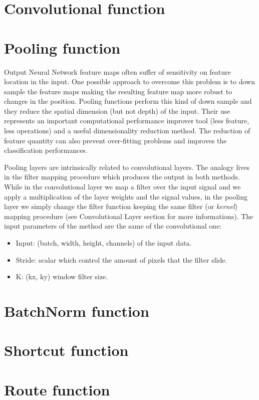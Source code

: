 \documentclass{standalone}
\begin{document}


\section[Convolutional]{Convolutional function}\label{convolutional}


\section[Pooling]{Pooling function}\label{pooling}

Output Neural Network feature maps often suffer of sensitivity on feature location in the input.
One possible approach to overcome this problem is to down sample the feature maps making the resulting feature map more robust to changes in the position.
Pooling functions perform this kind of down sample and they reduce the spatial dimension (but not depth) of the input.
Their use represents an important computational performance improver tool (less feature, less operations) and a useful dimensionality reduction method.
The reduction of feature quantity can also prevent over-fitting problems and improves the classification performances.

Pooling layers are intrinsically related to convolutional layers.
The analogy lives in the filter mapping procedure which produces the output in both methods.
While in the convolutional layer we map a filter over the input signal and we apply a multiplication of the layer weights and the signal values, in the pooling layer we simply change the filter function keeping the same filter (or \emph{kernel}) mapping procedure (see Convolutional Layer section for more informations).
The input parameters of the method are the same of the convolutional one:

\begin{itemize}

\item Input: (batch, width, height, channels) of the input data.

\item Stride: scalar which control the amount of pixels that the filter slide.

\item K: (kx, ky) window filter size.

\end{itemize}


\section[Batchnorm]{BatchNorm function}\label{batchnorm}

\section[Shortcut]{Shortcut function}\label{shortcut}

\section[Route]{Route function}\label{route}
\end{document}
